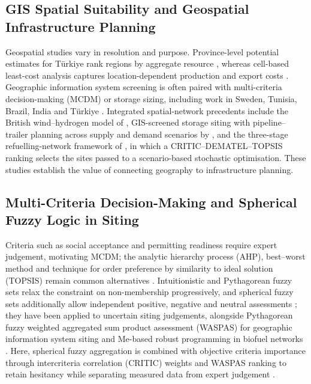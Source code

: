 \documentclass[preprint,12pt,authoryear]{elsarticle}
\begin{document}
\subsection{GIS Spatial Suitability and Geospatial Infrastructure Planning}
Geospatial studies vary in resolution and purpose. Province-level potential estimates for Türkiye rank regions by aggregate resource \citep{karayel2023green}, whereas cell-based least-cost analysis captures location-dependent production and export costs \citep{muller2023green}. Geographic information system screening is often paired with multi-criteria decision-making (MCDM) or storage sizing, including work in Sweden, Tunisia, Brazil, India and Türkiye \citep{gargi2026gis,rekik2024spatial,jin2025designing,leal2025site,thekkethil2024green,karipoglu2021,keskin2024,karipoglu2022,yilmaz2025,seker2020hydrogen,gul2026,celikdemir2026hubs,tuncer2026enerji,gul2023pv}. Integrated spatial-network precedents include the British wind--hydrogen model of \citet{samsatli2016optimal}, GIS-screened storage siting with pipeline--trailer planning across supply and demand scenarios by \citet{ma2025modeling}, and the three-stage refuelling-network framework of \citet{zhou2026collaborative}, in which a CRITIC--DEMATEL--TOPSIS ranking selects the sites passed to a scenario-based stochastic optimisation. These studies establish the value of connecting geography to infrastructure planning.

\subsection{Multi-Criteria Decision-Making and Spherical Fuzzy Logic in Siting}
Criteria such as social acceptance and permitting readiness require expert judgement, motivating MCDM; the analytic hierarchy process (AHP), best--worst method and technique for order preference by similarity to ideal solution (TOPSIS) remain common alternatives \citep{rezaei2016best}. Intuitionistic and Pythagorean fuzzy sets relax the constraint on non-membership progressively, and spherical fuzzy sets additionally allow independent positive, negative and neutral assessments \citep{zadeh1965fuzzy,atanassov1986intuitionistic,yager2013pythagorean,gundogdu2019spherical}; they have been applied to uncertain siting judgements, alongside Pythagorean fuzzy weighted aggregated sum product assessment (WASPAS) for geographic information system siting and Me-based robust programming in biofuel networks \citep{dagistanli2024facility,mondal2023integrated}. Here, spherical fuzzy aggregation is combined with objective criteria importance through intercriteria correlation (CRITIC) weights and WASPAS ranking to retain hesitancy while separating measured data from expert judgement \citep{diakoulaki1995determining,zavadskas2012optimization}.
\end{document}
